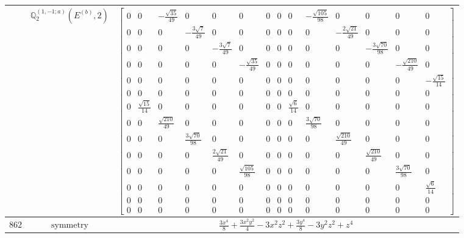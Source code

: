 \documentclass[fleqn,8pt,landscape]{jsarticle}
\begin{document}
\begin{longtable}{ccc}
$  $ & $ \mathbb{Q}_{2}^{(1,-1;a)}(E^{(b)},2) $ & $ \begin{bmatrix} 0 & 0 & - \frac{\sqrt{35}}{49} & 0 & 0 & 0 & 0 & 0 & 0 & - \frac{\sqrt{105}}{98} & 0 & 0 & 0 & 0 \\ 0 & 0 & 0 & - \frac{3 \sqrt{7}}{49} & 0 & 0 & 0 & 0 & 0 & 0 & - \frac{2 \sqrt{21}}{49} & 0 & 0 & 0 \\ 0 & 0 & 0 & 0 & - \frac{3 \sqrt{7}}{49} & 0 & 0 & 0 & 0 & 0 & 0 & - \frac{3 \sqrt{70}}{98} & 0 & 0 \\ 0 & 0 & 0 & 0 & 0 & - \frac{\sqrt{35}}{49} & 0 & 0 & 0 & 0 & 0 & 0 & - \frac{\sqrt{210}}{49} & 0 \\ 0 & 0 & 0 & 0 & 0 & 0 & 0 & 0 & 0 & 0 & 0 & 0 & 0 & - \frac{\sqrt{15}}{14} \\ 0 & 0 & 0 & 0 & 0 & 0 & 0 & 0 & 0 & 0 & 0 & 0 & 0 & 0 \\ 0 & \frac{\sqrt{15}}{14} & 0 & 0 & 0 & 0 & 0 & 0 & \frac{\sqrt{6}}{14} & 0 & 0 & 0 & 0 & 0 \\ 0 & 0 & \frac{\sqrt{210}}{49} & 0 & 0 & 0 & 0 & 0 & 0 & \frac{3 \sqrt{70}}{98} & 0 & 0 & 0 & 0 \\ 0 & 0 & 0 & \frac{3 \sqrt{70}}{98} & 0 & 0 & 0 & 0 & 0 & 0 & \frac{\sqrt{210}}{49} & 0 & 0 & 0 \\ 0 & 0 & 0 & 0 & \frac{2 \sqrt{21}}{49} & 0 & 0 & 0 & 0 & 0 & 0 & \frac{\sqrt{210}}{49} & 0 & 0 \\ 0 & 0 & 0 & 0 & 0 & \frac{\sqrt{105}}{98} & 0 & 0 & 0 & 0 & 0 & 0 & \frac{3 \sqrt{70}}{98} & 0 \\ 0 & 0 & 0 & 0 & 0 & 0 & 0 & 0 & 0 & 0 & 0 & 0 & 0 & \frac{\sqrt{6}}{14} \\ 0 & 0 & 0 & 0 & 0 & 0 & 0 & 0 & 0 & 0 & 0 & 0 & 0 & 0 \\ 0 & 0 & 0 & 0 & 0 & 0 & 0 & 0 & 0 & 0 & 0 & 0 & 0 & 0 \end{bmatrix} $ \\ \hline
$ 862 $ & $ \text{symmetry} $ & $ \frac{3 x^{4}}{8} + \frac{3 x^{2} y^{2}}{4} - 3 x^{2} z^{2} + \frac{3 y^{4}}{8} - 3 y^{2} z^{2} + z^{4} $ \\

\end{longtable}
\end{document}
